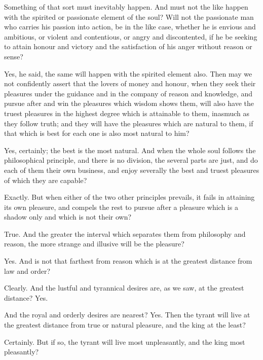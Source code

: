 Something of that sort must inevitably happen.
And must not the like happen with the spirited or passionate element of the soul? Will not the passionate man who carries his passion into action, be in the like case, whether he is envious and ambitious, or violent and contentious, or angry and discontented, if he be seeking to attain honour and victory and the satisfaction of his anger without reason or sense?

Yes, he said, the same will happen with the spirited element also.
Then may we not confidently assert that the lovers of money and honour, when they seek their pleasures under the guidance and in the company of reason and knowledge, and pursue after and win the pleasures which wisdom shows them, will also have the truest pleasures in the highest degree which is attainable to them, inasmuch as they follow truth; and they will have the pleasures which are natural to them, if that which is best for each one is also most natural to him?

Yes, certainly; the best is the most natural.
And when the whole soul follows the philosophical principle, and there is no division, the several parts are just, and do each of them their own business, and enjoy severally the best and truest pleasures of which they are capable?

Exactly.
But when either of the two other principles prevails, it fails in attaining its own pleasure, and compels the rest to pursue after a pleasure which is a shadow only and which is not their own?

True.
And the greater the interval which separates them from philosophy and reason, the more strange and illusive will be the pleasure?

Yes.
And is not that farthest from reason which is at the greatest distance from law and order?

Clearly.
And the lustful and tyrannical desires are, as we saw, at the greatest distance? Yes.

And the royal and orderly desires are nearest?
Yes.
Then the tyrant will live at the greatest distance from true or natural pleasure, and the king at the least?

Certainly.
But if so, the tyrant will live most unpleasantly, and the king most pleasantly?

Inevitably.
Would you know the measure of the interval which separates them?
Will you tell me?
There appear to be three pleasures, one genuine and two spurious: now the transgression of the tyrant reaches a point beyond the spurious; he has run away from the region of law and reason, and taken up his abode with certain slave pleasures which are his satellites, and the measure of his inferiority can only be expressed in a figure.


